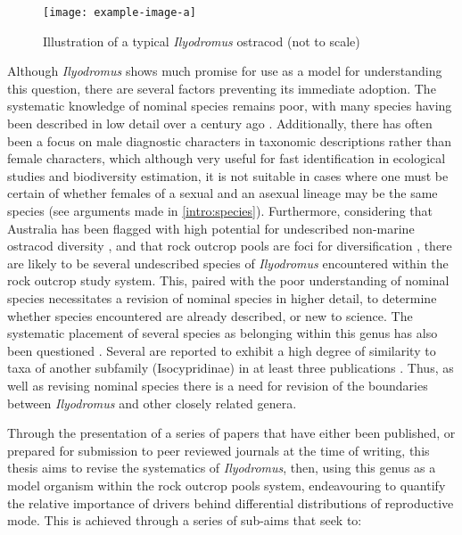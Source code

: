\begin{figure}
\centering
{\texttt{[image: example-image-a]}}
\caption[Impression of a typical \textit{Ilyodromus} ostracod]{Illustration of a typical \textit{Ilyodromus} ostracod (not to scale)}
\label{fig:introfigure7}
\end{figure}

Although \textit{Ilyodromus} shows much promise for use as a model for understanding this question, there are several factors preventing its immediate adoption. The systematic knowledge of nominal species remains poor, with many species having been described in low detail over a century ago \parencite{sars_contributions_1894,sars_freshwater_1896,king_australian_1855}. Additionally, there has often been a focus on male diagnostic characters in taxonomic descriptions rather than female characters, which although very useful for fast identification in ecological studies and biodiversity estimation, it is not suitable in cases where one must be certain of whether females of a sexual and an asexual lineage may be the same species (see arguments made in \cref{intro:species}). Furthermore, considering that Australia has been flagged with high potential for undescribed non-marine ostracod diversity \parencite{martens_global_2008}, and that rock outcrop pools are foci for diversification \parencite{pinder_granite_2000}, there are likely to be several undescribed species of \textit{Ilyodromus} encountered within the rock outcrop study system. This, paired with the poor understanding of nominal species necessitates a revision of nominal species in higher detail, to determine whether species encountered are already described, or new to science. The systematic placement of several species as belonging within this genus has also been questioned \parencite{martens_taxonomy_2001}. Several are reported to exhibit a high degree of similarity to taxa of another subfamily (Isocypridinae) in at least three publications \parencite{martens_taxonomy_2001,de_deckker_ostracoda_1981,mckenzie_freshwater_1966}. Thus, as well as revising nominal species there is a need for revision of the boundaries between \textit{Ilyodromus} and other closely related genera. 

Through the presentation of a series of papers that have either been published, or prepared for submission to peer reviewed journals at the time of writing, this thesis aims to revise the systematics of \textit{Ilyodromus}, then, using this genus as a model organism within the rock outcrop pools system, endeavouring to quantify the relative importance of drivers behind differential distributions of reproductive mode. This is achieved through a series of sub-aims that seek to:

